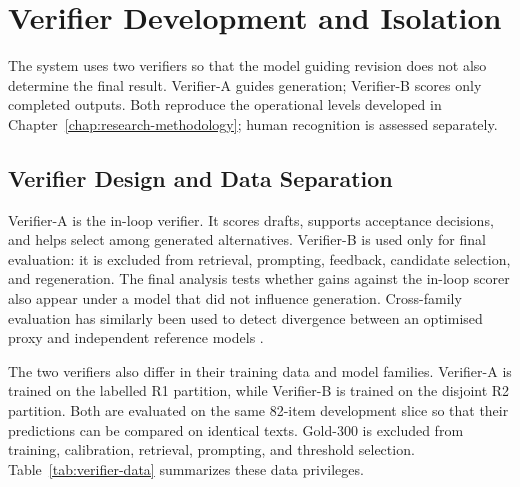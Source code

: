 
\chapter{Verifier Development and Isolation}
\label{chap:verifier-development}

\ifpdf
    \graphicspath{{Chapter4/Figs/Raster/}{Chapter4/Figs/PDF/}{Chapter4/Figs/}{Chapter4/figures/}}
\else
    \graphicspath{{Chapter4/Figs/Vector/}{Chapter4/Figs/}{Chapter4/figures/}}
\fi

The system uses two verifiers so that the model guiding revision does not also determine the final result. Verifier-A guides generation; Verifier-B scores only completed outputs. Both reproduce the operational levels developed in Chapter~\ref{chap:research-methodology}; human recognition is assessed separately.

\section{Verifier Design and Data Separation}

Verifier-A is the in-loop verifier. It scores drafts, supports acceptance decisions, and helps select among generated alternatives. Verifier-B is used only for final evaluation: it is excluded from retrieval, prompting, feedback, candidate selection, and regeneration. The final analysis tests whether gains against the in-loop scorer also appear under a model that did not influence generation. Cross-family evaluation has similarly been used to detect divergence between an optimised proxy and independent reference models \cite{b69}.

The two verifiers also differ in their training data and model families. Verifier-A is trained on the labelled R1 partition, while Verifier-B is trained on the disjoint R2 partition. Both are evaluated on the same 82-item development slice so that their predictions can be compared on identical texts. Gold-300 is excluded from training, calibration, retrieval, prompting, and threshold selection. Table~\ref{tab:verifier-data} summarizes these data privileges.


